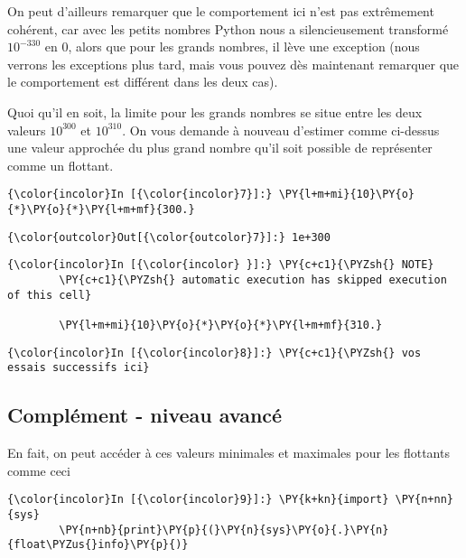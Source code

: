     On peut d'ailleurs remarquer que le comportement ici n'est pas
extrêmement cohérent, car avec les petits nombres Python nous a
silencieusement transformé \(10^{-330}\) en \(0\), alors que pour les
grands nombres, il lève une exception (nous verrons les exceptions plus
tard, mais vous pouvez dès maintenant remarquer que le comportement est
différent dans les deux cas).

    Quoi qu'il en soit, la limite pour les grands nombres se situe entre les
deux valeurs \(10^{300}\) et \(10^{310}\). On vous demande à nouveau
d'estimer comme ci-dessus une valeur approchée du plus grand nombre
qu'il soit possible de représenter comme un flottant.

    \begin{Verbatim}[commandchars=\\\{\}]
{\color{incolor}In [{\color{incolor}7}]:} \PY{l+m+mi}{10}\PY{o}{*}\PY{o}{*}\PY{l+m+mf}{300.}
\end{Verbatim}


\begin{Verbatim}[commandchars=\\\{\}]
{\color{outcolor}Out[{\color{outcolor}7}]:} 1e+300
\end{Verbatim}
            
    \begin{Verbatim}[commandchars=\\\{\}]
{\color{incolor}In [{\color{incolor} }]:} \PY{c+c1}{\PYZsh{} NOTE}
        \PY{c+c1}{\PYZsh{} automatic execution has skipped execution of this cell}
        
        \PY{l+m+mi}{10}\PY{o}{*}\PY{o}{*}\PY{l+m+mf}{310.}
\end{Verbatim}


    \begin{Verbatim}[commandchars=\\\{\}]
{\color{incolor}In [{\color{incolor}8}]:} \PY{c+c1}{\PYZsh{} vos essais successifs ici}
\end{Verbatim}


    \hypertarget{compluxe9ment---niveau-avancuxe9}{%
\subsection{Complément - niveau
avancé}\label{compluxe9ment---niveau-avancuxe9}}

    En fait, on peut accéder à ces valeurs minimales et maximales pour les
flottants comme ceci

    \begin{Verbatim}[commandchars=\\\{\}]
{\color{incolor}In [{\color{incolor}9}]:} \PY{k+kn}{import} \PY{n+nn}{sys}
        \PY{n+nb}{print}\PY{p}{(}\PY{n}{sys}\PY{o}{.}\PY{n}{float\PYZus{}info}\PY{p}{)}
\end{Verbatim}



